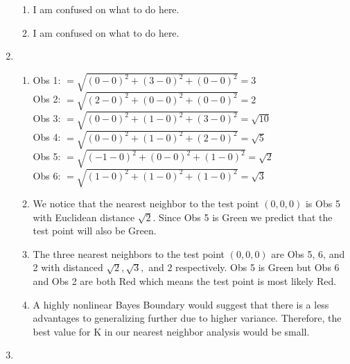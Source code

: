 \documentclass{article}
\begin{document}
\begin{enumerate}
\begin{enumerate}
        \item
        
        I am confused on what to do here.
        
        \item
        
        I am confused on what to do here.
        
    \end{enumerate}
    
    \item
    
    \begin{enumerate}
        \item
    
        Obs 1: $= \sqrt{(0-0)^2+(3-0)^2+(0-0)^2} = 3$\\
        Obs 2: $= \sqrt{(2-0)^2+(0-0)^2+(0-0)^2} = 2$\\
        Obs 3: $= \sqrt{(0-0)^2+(1-0)^2+(3-0)^2} = \sqrt{10}$\\
        Obs 4: $= \sqrt{(0-0)^2+(1-0)^2+(2-0)^2} = \sqrt{5}$\\
        Obs 5: $= \sqrt{(-1-0)^2+(0-0)^2+(1-0)^2} = \sqrt{2}$\\
        Obs 6: $= \sqrt{(1-0)^2+(1-0)^2+(1-0)^2} = \sqrt{3}$\\
            
        \item
        
        We notice that the nearest neighbor to the test point $(0,0,0)$ is Obs 5 with Euclidean distance $\sqrt{2}$. Since Obs 5 is Green we predict that the test point will also be Green.
            
        \item
            
        The three nearest neighbors to the test point $(0,0,0)$ are Obs 5, 6, and 2 with distanced $\sqrt{2},\sqrt{3},$ and $2$ respectively. Obs 5 is Green but Obs 6 and Obs 2 are both Red which means the test point is most likely Red.
            
        \item
            
        A highly nonlinear Bayes Boundary would suggest that there is a less advantages to generalizing further due to higher variance. Therefore, the best value for K in our nearest neighbor analysis would be small.
    \end{enumerate}
    
    \item
    

\end{enumerate}
\end{document}
